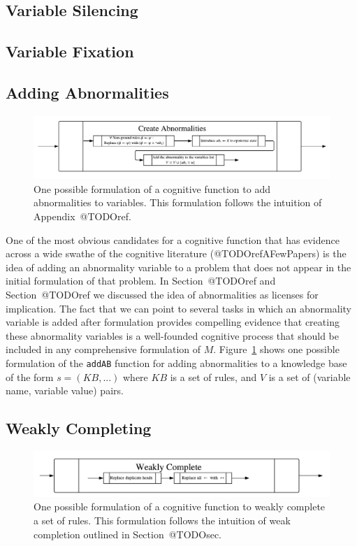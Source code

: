 \documentclass[
11pt, %
english, %
singlespacing, %
headsepline, %
]{MastersDoctoralThesis} %
\begin{document}
\subsection{Variable Silencing}
\subsection{Variable Fixation}
\subsection{Adding Abnormalities}
\begin{figure} 
\begin{center}
\includegraphics[width=\linewidth]{abnormalitySCP}
\end{center}
\caption{One possible formulation of a cognitive function to add abnormalities to variables. This formulation follows the intuition of Appendix~@TODOref.}
\label{fig:addAB}
\end{figure}

One of the most obvious candidates for a cognitive function that has evidence across a wide swathe of the cognitive literature (@TODOrefAFewPapers) is the idea of adding an abnormality variable to a problem that does not appear in the initial formulation of that problem. In Section~@TODOref and Section~@TODOref we discussed the idea of abnormalities as licenses for implication. The fact that we can point to several tasks in which an abnormality variable is added after formulation provides compelling evidence that creating these abnormality variables is a well-founded cognitive process that should be included in any comprehensive formulation of $M$. Figure~\ref{fig:addAB} shows one possible formulation of the \texttt{addAB} function for adding abnormalities to a knowledge base of the form $s=(KB,...)$ where $KB$ is a set of rules, and $V$ is a set of (variable name, variable value) pairs.



\subsection{Weakly Completing}
\begin{figure} 
\begin{center}
\includegraphics[width=\linewidth]{weaklycompleteSCP}
\end{center}
\caption{One possible formulation of a cognitive function to weakly complete a set of rules. This formulation follows the intuition of weak completion outlined in Section~@TODOsec.}
\label{fig:weaklycompleteSCP}
\end{figure}
\end{document}
